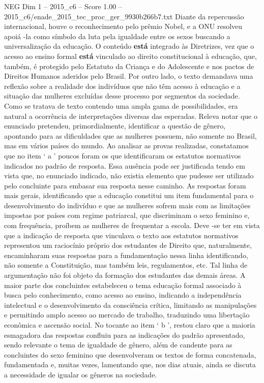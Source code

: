 \begin{textsample}{NEG Dim 1 – 2015\_c6 – Score 1.00 – 2015\_c6/enade\_2015\_tec\_proc\_ger\_9930b266b7.txt}
Diante da repercussão internacional, houve o reconhecimento pelo prêmio Nobel, e a ONU resolveu apoiá -la como símbolo da luta pela igualdade entre os sexos buscando a universalização da educação.
O conteúdo \textbf{está} integrado às Diretrizes, vez que o acesso ao ensino formal \textbf{está} vinculado ao direito constitucional à educação, que, também, é protegido pelo Estatuto da Criança e do Adolescente e nos pactos de Direitos Humanos aderidos pelo Brasil.
Por outro lado, o texto demandava uma reflexão sobre a realidade dos indivíduos que não têm acesso à educação e a situação das mulheres excluídas desse processo por segmentos da sociedade.
Como se tratava de texto contendo uma ampla gama de possibilidades, era natural a ocorrência de interpretações diversas das esperadas.
Releva notar que o enunciado pretendeu, primordialmente, identificar a questão de gênero, apontando para as dificuldades que as mulheres possuem, não somente no Brasil, mas em vários países do mundo.
Ao analisar as provas realizadas, constatamos que no item ‘ a ’ poucos foram os que identificaram os estatutos normativos indicados no padrão de resposta.
Essa ausência pode ser justificada tendo em vista que, no enunciado indicado, não existia elemento que pudesse ser utilizado pelo concluinte para embasar sua resposta nesse caminho.
As respostas foram mais gerais, identificando que a educação constitui um item fundamental para o desenvolvimento do indivíduo e que as mulheres sofrem mais com as limitações impostas por países com regime patriarcal, que discriminam o sexo feminino e, com frequência, proíbem as mulheres de frequentar a escola.
Deve -se ter em vista que a indicação de resposta que vinculava o texto aos estatutos normativos representou um raciocínio próprio dos estudantes de Direito que, naturalmente, encaminharam suas respostas para a fundamentação nessa linha identificando, não somente a Constituição, mas também leis, regulamentos, etc.
Tal linha de argumentação não foi objeto da formação dos estudantes das demais áreas.
A maior parte dos concluintes estabeleceu o tema educação formal associado à busca pelo conhecimento, como acesso ao ensino, indicando a independência intelectual e o desenvolvimento da consciência crítica, limitando as manipulações e permitindo amplo acesso ao mercado de trabalho, traduzindo uma libertação econômica e ascensão social.
No tocante ao item ‘ b ’, restou claro que a maioria esmagadora das respostas confluiu para as indicações do padrão apresentado, sendo relevante o tema de igualdade de gênero, além de candente para as concluintes do sexo feminino que desenvolveram os textos de forma concatenada, fundamentada e, muitas vezes, lamentando que, nos dias atuais, ainda se discuta a necessidade de igualar os gêneros na sociedade.

\end{textsample}
